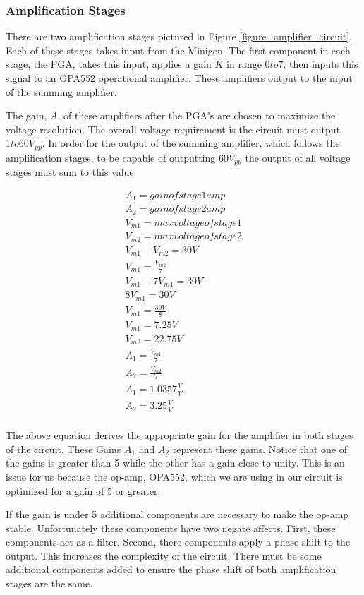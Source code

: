 \documentclass{article}	%
\begin{document}
\begin{multicols}{2}
\subsubsection{Amplification Stages}
There are two amplification stages pictured in
Figure \ref{figure_amplifier_circuit}.
Each of these stages takes input from the Minigen.
The first component in each stage, the PGA,
takes this input,
applies a gain $K$ in range $0 to 7$, then
inputs this signal to an OPA552 operational amplifier.
These amplifiers output to the input of the summing amplifier.

The gain, $A$, of these amplifiers after the PGA's are chosen
to maximize the voltage resolution.
The overall voltage requirement is the circuit must output $1 to 60V_{pp}$.
In order for the output of the summing amplifier,
which follows the amplification stages,
to be capable of outputting $60V_{pp}$ the output of all voltage
stages must sum to this value.

\begin{gather*}
A_1 = gain of stage 1 amp \\ 
A_2 = gain of stage 2 amp\\
V_{m1} = max voltage of stage 1\\
V_{m2} = max voltage of stage 2\\
V_{m1} + V_{m2} = 30V\\
V_{m1} = \frac{V_{m2}}{7}\\
V_{m1} + 7V_{m1} = 30V\\
8V_{m1} = 30V\\
V_{m1} = \frac{30V}{8}\\
V_{m1} = 7.25V\\
V_{m2} = 22.75V\\
A_1 = \frac{V_{m1}}{7}\\
A_2 = \frac{V_{m2}}{7}\\
A_1 = 1.0357\frac{V}{V}\\
A_2 = 3.25\frac{V}{V}\\
\end{gather*}

The above equation derives the appropriate
gain for the amplifier in both stages
of the circuit.
These Gains $A_1$ and $A_2$ represent these gains.
Notice that one of the gains is greater than
5 while the other has a gain close to unity.
This is an issue for us because the op-amp,
OPA552, which we are using in our circuit is 
optimized for a gain of 5 or greater.

If the gain is under 5 additional components
are necessary to make the op-amp stable.
Unfortunately these components have two negate affects.
First, these components act as a filter.
Second, there components apply a phase shift to the output.
This increases the complexity of the circuit.
There must be some additional components added
to ensure the phase shift of both amplification stages are the same.


\end{multicols}
\end{document}
